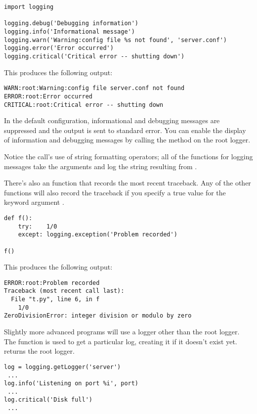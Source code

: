 \documentclass{howto}
\begin{document}
\begin{verbatim}
import logging

logging.debug('Debugging information')
logging.info('Informational message')
logging.warn('Warning:config file %s not found', 'server.conf')
logging.error('Error occurred')
logging.critical('Critical error -- shutting down')
\end{verbatim}

This produces the following output:

\begin{verbatim}
WARN:root:Warning:config file server.conf not found
ERROR:root:Error occurred
CRITICAL:root:Critical error -- shutting down
\end{verbatim}

In the default configuration, informational and debugging messages are
suppressed and the output is sent to standard error.  You can enable
the display of information and debugging messages by calling the
 method on the root logger.

Notice the  call's use of string formatting
operators; all of the functions for logging messages take the
arguments  and log the
string resulting from .

There's also an  function that records the most
recent traceback.  Any of the other functions will also record the
traceback if you specify a true value for the keyword argument
.

\begin{verbatim}
def f():
    try:    1/0
    except: logging.exception('Problem recorded')

f()
\end{verbatim}

This produces the following output:

\begin{verbatim}
ERROR:root:Problem recorded
Traceback (most recent call last):
  File "t.py", line 6, in f
    1/0
ZeroDivisionError: integer division or modulo by zero
\end{verbatim}

Slightly more advanced programs will use a logger other than the root
logger.  The  function is used to get
a particular log, creating it if it doesn't exist yet.
 returns the root logger.


\begin{verbatim}
log = logging.getLogger('server')
 ...
log.info('Listening on port %i', port)
 ...
log.critical('Disk full')
 ...
\end{verbatim}
\end{document}
